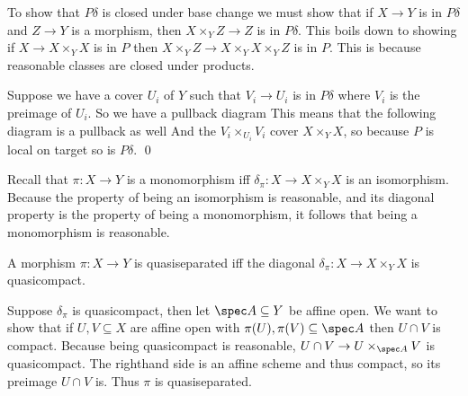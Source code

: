     To show that $P\delta$ is closed under base change we must show that if $X\to Y$ is in $P\delta$ and
    $Z\to Y$ is a morphism, then $X\times_YZ\to Z$ is in $P\delta$.
    This boils down to showing if $X\to X\times_YX$ is in $P$ then $X\times_YZ\to X\times_YX\times_YZ$ is
    in $P$.
    This is because reasonable classes are closed under products.

    Suppose we have a cover $U_i$ of $Y$ such that $V_i\to U_i$ is in $P\delta$ where $V_i$ is the preimage
    of $U_i$.
    So we have a pullback diagram
    This means that the following diagram is a pullback as well
    And the $V_i\times_{U_i}V_i$ cover $X\times_YX$, so because $P$ is local on target so is $P\delta$.
    \qed

\eproof

\bexam

    Recall that $\pi\colon X\to Y$ is a monomorphism iff $\delta_\pi\colon X\to X\times_YX$ is an isomorphism.
    Because the property of being an isomorphism is reasonable, and its diagonal property is the property
    of being a monomorphism, it follows that being a monomorphism is reasonable.

\eexam

\bprop

    A morphism $\pi\colon X\to Y$ is quasiseparated iff the diagonal $\delta_\pi\colon X\to X\times_YX$
    is quasicompact.

\eprop

\bproof

    Suppose $\delta_\pi$ is quasicompact, then let $\spec A\subseteq Y$ be affine open.
    We want to show that if $U,V\subseteq X$ are affine open with $\pi(U),\pi(V)\subseteq\spec A$ then
    $U\cap V$ is compact.
    Because being quasicompact is reasonable, $U\cap V\to U\times_{\spec A}V$ is quasicompact.
    The righthand side is an affine scheme and thus compact, so its preimage $U\cap V$ is.
    Thus $\pi$ is quasiseparated.

